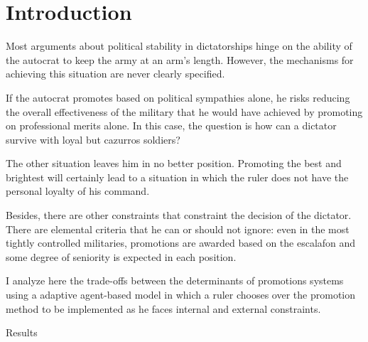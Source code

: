 \section{Introduction}

Most arguments about political stability in dictatorships hinge on the ability
of the autocrat to keep the army at an arm's length. However, the mechanisms for
achieving this situation are never clearly specified. 

If the autocrat promotes based on political sympathies alone, he risks reducing
the overall effectiveness of the military that he would have achieved by
promoting on professional merits alone. In this case, the question is how can a
dictator survive with loyal but cazurros soldiers?

The other situation leaves him in no better position. Promoting the best and
brightest will certainly lead to a situation in which the ruler does not have
the personal loyalty of his command.

Besides, there are other constraints that constraint the decision of the
dictator. There are elemental criteria that he can or should not ignore: even in
the most tightly controlled militaries, promotions are awarded based on the
escalafon and some degree of seniority is expected in each position.

I analyze here the trade-offs between the determinants of promotions systems
using a adaptive agent-based model in which a ruler chooses over the promotion
method to be implemented as he faces internal and external constraints. 

Results



